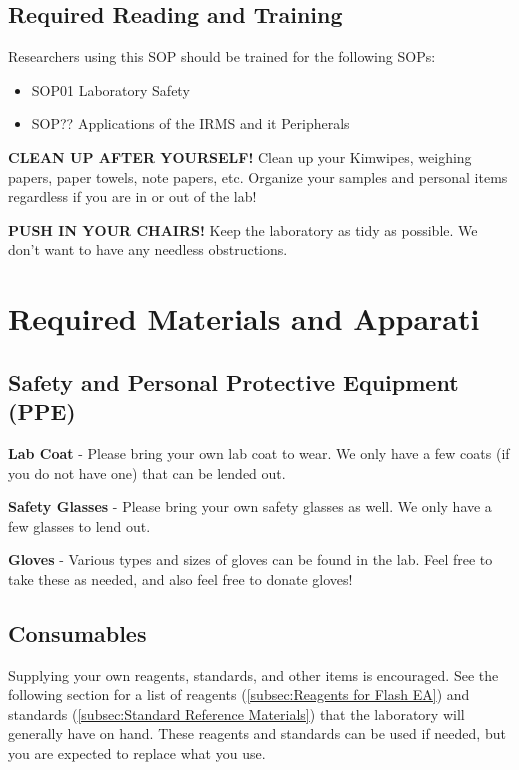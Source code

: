 \documentclass[12pt]{../SOP3_beta}\usepackage[]{graphicx}\usepackage[]{color}
\begin{document}
\subsection{Required Reading and Training}

\NP Researchers using this SOP should be trained for the following SOPs:

\begin{itemize}
  \item SOP01 Laboratory Safety
  \item SOP?? Applications of the IRMS and it Peripherals
\end{itemize}

\NP \textbf{CLEAN UP AFTER YOURSELF!} Clean up your Kimwipes, weighing papers, paper towels, note papers, etc. Organize your samples and personal items regardless if you are in or out of the lab!

\NP \textbf{PUSH IN YOUR CHAIRS!} Keep the laboratory as tidy as possible. We don't want to have any needless obstructions.


\section{Required Materials and Apparati}

\subsection{Safety and Personal Protective Equipment (PPE)}

\NP \textbf{Lab Coat} - Please bring your own lab coat to wear. We only have a few coats (if you do not have one) that can be lended out.

\NP \textbf{Safety Glasses} - Please bring your own safety glasses as well. We only have a few glasses to lend out.

\NP \textbf{Gloves} - Various types and sizes of gloves can be found in the lab. Feel free to take these as needed, and also feel free to donate gloves!

\subsection{Consumables}

\NP Supplying your own reagents, standards, and other items is encouraged. See the following section for a list of reagents (\ref{subsec:Reagents for Flash EA}) and standards (\ref{subsec:Standard Reference Materials}) that the laboratory will generally have on hand. These reagents and standards can be used if needed, but you are expected to replace what you use.
\end{document}
